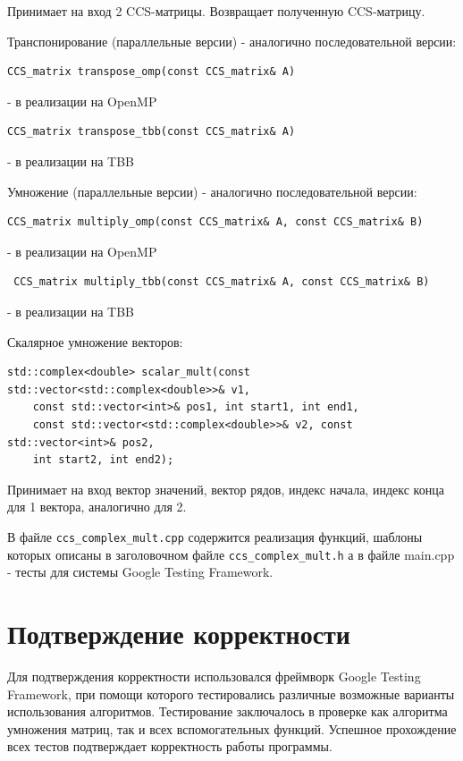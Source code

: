 \documentclass{report}
\begin{document}
Принимает на вход 2 CCS-матрицы. Возвращает полученную CCS-матрицу.
\par Транспонирование (параллельные версии) - аналогично последовательной версии:
\begin{lstlisting}
CCS_matrix transpose_omp(const CCS_matrix& A)
\end{lstlisting}
 - в реализации на OpenMP
\begin{lstlisting}
CCS_matrix transpose_tbb(const CCS_matrix& A)
\end{lstlisting}
 - в реализации на TBB
 \par Умножение (параллельные версии) - аналогично последовательной версии:
\begin{lstlisting}
CCS_matrix multiply_omp(const CCS_matrix& A, const CCS_matrix& B)
\end{lstlisting}
 - в реализации на OpenMP
\begin{lstlisting}
 CCS_matrix multiply_tbb(const CCS_matrix& A, const CCS_matrix& B)
\end{lstlisting}
 - в реализации на TBB
 \par Скалярное умножение векторов:
\begin{lstlisting}
std::complex<double> scalar_mult(const std::vector<std::complex<double>>& v1,
    const std::vector<int>& pos1, int start1, int end1,
    const std::vector<std::complex<double>>& v2, const std::vector<int>& pos2,
    int start2, int end2);
\end{lstlisting}
Принимает на вход вектор значений, вектор рядов, индекс начала, индекс конца для 1 вектора, аналогично для 2.
\par В файле  \verb|ccs_complex_mult.cpp| содержится реализация функций, шаблоны которых описаны в заголовочном файле \verb|ccs_complex_mult.h| а в файле main.cpp - тесты для системы Google Testing Framework.

\newpage

\section*{Подтверждение корректности}
Для подтверждения корректности использовался фреймворк Google Testing Framework, при помощи которого тестировались различные возможные варианты использования алгоритмов. Тестирование заключалось в проверке как алгоритма умножения матриц, так и всех вспомогательных функций. Успешное прохождение всех тестов подтверждает корректность работы программы.
\newpage
\end{document}
